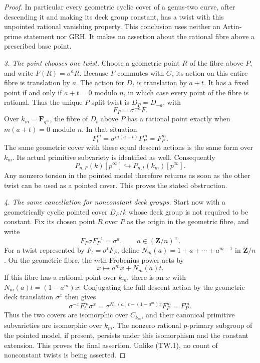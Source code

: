 \begin{proof}
In particular every geometric cyclic cover of a genus-two
curve, after descending it and making its deck group constant,
has a twist with this unpointed rational vanishing property.
This conclusion uses neither an Artin-prime statement nor GRH.
It makes no assertion about the rational fibre above a
prescribed base point.

\emph{3. The point chooses one twist.}
Choose a geometric point $R$ of the fibre above $P$, and write
$F(R)=\sigma^a R$. Because $F$ commutes with $G$, its action
on this entire fibre is translation by $a$. The action for
$D_t$ is translation by $a+t$. It has a fixed point if and
only if $a+t=0$ modulo $n$, in which case every point of the
fibre is rational. Thus the unique $P$-split twist is
$D_P=D_{-a}$, with
\[
                              F_P=\sigma^{-a}F.
\]
Over $k_m=\mathbf F_{q^m}$, the fibre of $D_t$ above $P$
has a rational point exactly when $m(a+t)=0$ modulo $n$.
In that situation
\[
 F_t^m=\sigma^{m(a+t)}F_P^m=F_P^m.
 \tag{TW.5}
\]
The same geometric cover with these equal descent actions is
the same form over $k_m$. Its actual primitive subvariety is
identified as well. Consequently
\[
             P_{n,P}(k)[p^\infty]
                      \hookrightarrow P_{n,t}(k_m)[p^\infty].
 \tag{TW.6}
\]
Any nonzero torsion in the pointed model therefore returns as
soon as the other twist can be used as a pointed cover.
This proves the stated obstruction.

\emph{4. The same cancellation for nonconstant deck groups.}
Start now with a geometrically cyclic pointed cover $D_P/k$
whose deck group is not required to be constant. Fix its chosen
point $R$ over $P$ as the origin in the geometric fibre, and
write
\[
 F_P\sigma F_P^{-1}=\sigma^a,\qquad a\in(\mathbf Z/n)^\times.
\]
For a twist represented by $F_t=\sigma^t F_P$, define
$N_m(a)=1+a+\cdots+a^{m-1}$ in $\mathbf Z/n$. On the
geometric fibre, the $m$th Frobenius power acts by
\[
                         x\longmapsto a^m x+N_m(a)t.
 \tag{TW.7}
\]
If this fibre has a rational point over $k_m$, there is an $x$
with $N_m(a)t=(1-a^m)x$. Conjugating the full descent action
by the geometric deck translation $\sigma^x$ then gives
\[
 \sigma^{-x}F_t^m\sigma^x
       =\sigma^{N_m(a)t-(1-a^m)x}F_P^m=F_P^m.
 \tag{TW.8}
\]
Thus the two covers are isomorphic over $C_{k_m}$, and their
canonical primitive subvarieties are isomorphic over $k_m$.
The nonzero rational $p$-primary subgroup of the pointed model,
if present, persists under this isomorphism and the constant
extension. This proves the final assertion. Unlike (TW.1),
no count of nonconstant twists is being asserted.
\end{proof}

